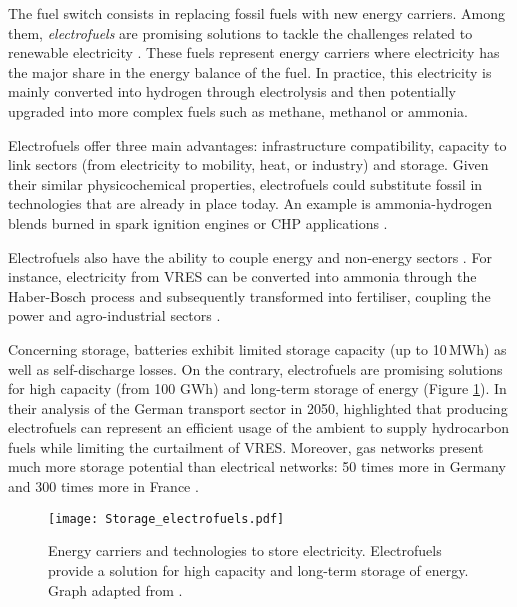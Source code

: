 The fuel switch consists in replacing fossil fuels with new energy carriers.  Among them, \textit{electrofuels} are promising solutions to tackle the challenges related to renewable electricity \cite{rozzi2020}. These fuels represent energy carriers where electricity has the major share in the energy balance of the fuel. In practice, this electricity is mainly converted into hydrogen through electrolysis and then potentially upgraded into more complex fuels such as methane, methanol or ammonia. 

Electrofuels offer three main advantages: infrastructure compatibility, capacity to link sectors (\ie from electricity to mobility, heat, or industry) and storage. Given their similar physicochemical properties, electrofuels could substitute fossil in technologies that are already in place today. An example is ammonia-hydrogen blends burned in spark ignition engines \cite{lhuillier2020experimental} or \gls{CHP} applications \cite{pochet202022}.

Electrofuels also have the ability to couple energy and non-energy sectors \cite{Stancin2020}. For instance, electricity from \gls{VRES} can be converted into ammonia through the Haber-Bosch process and subsequently transformed into fertiliser, coupling the power and agro-industrial sectors \cite{verleysen2020can}. 

Concerning storage,  batteries exhibit limited storage capacity (up to 10\,MWh) as well as self-discharge losses. On the contrary, electrofuels are promising solutions for high capacity (from 100 GWh) and long-term storage of energy \cite{child2018role, dias2020energy} (Figure \ref{fig:intro:Storage_electrofuels}). In their analysis of the German transport sector in 2050, \citet{millinger2021electrofuels} highlighted that producing electrofuels can represent an efficient usage of the ambient  to supply hydrocarbon fuels while limiting the curtailment of \gls{VRES}. Moreover, gas networks present much more storage potential than electrical networks: 50 times more in Germany and 300 times more in France \cite{Rosa2017}. 

\begin{figure}[htbp!]
\centering
\texttt{[image: Storage\_electrofuels.pdf]}
\caption{Energy carriers and technologies to store electricity. Electrofuels provide a solution for high capacity and long-term storage of energy. Graph adapted from \cite{ISPT2017}.}
\label{fig:intro:Storage_electrofuels}
\end{figure}

